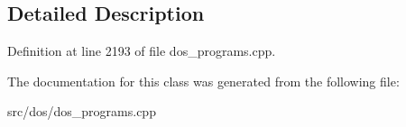 \subsection{Detailed Description}


Definition at line 2193 of file dos\-\_\-programs.\-cpp.



The documentation for this class was generated from the following file\-:\begin{DoxyCompactItemize}
\item 
src/dos/dos\-\_\-programs.\-cpp\end{DoxyCompactItemize}
